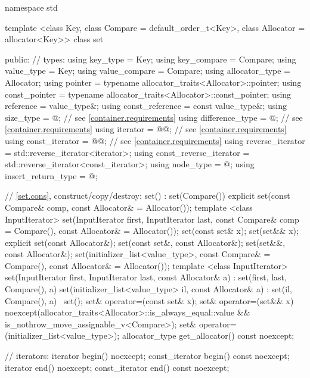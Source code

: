 \begin{codeblock}
namespace std {
  template <class Key, class Compare = default_order_t<Key>,
            class Allocator = allocator<Key>>
  class set {
  public:
    // types:
    using key_type               = Key;
    using key_compare            = Compare;
    using value_type             = Key;
    using value_compare          = Compare;
    using allocator_type         = Allocator;
    using pointer                = typename allocator_traits<Allocator>::pointer;
    using const_pointer          = typename allocator_traits<Allocator>::const_pointer;
    using reference              = value_type&;
    using const_reference        = const value_type&;
    using size_type              = @\impdef@; // see \ref{container.requirements}
    using difference_type        = @\impdef@; // see \ref{container.requirements}
    using iterator               = @@; // see \ref{container.requirements}
    using const_iterator         = @@; // see \ref{container.requirements}
    using reverse_iterator       = std::reverse_iterator<iterator>;
    using const_reverse_iterator = std::reverse_iterator<const_iterator>;
    using node_type              = @\unspec@;
    using insert_return_type     = @\unspec@;

    // \ref{set.cons}, construct/copy/destroy:
    set() : set(Compare()) { }
    explicit set(const Compare& comp, const Allocator& = Allocator());
    template <class InputIterator>
      set(InputIterator first, InputIterator last,
          const Compare& comp = Compare(), const Allocator& = Allocator());
    set(const set& x);
    set(set&& x);
    explicit set(const Allocator&);
    set(const set&, const Allocator&);
    set(set&&, const Allocator&);
    set(initializer_list<value_type>, const Compare& = Compare(),
        const Allocator& = Allocator());
    template <class InputIterator>
      set(InputIterator first, InputIterator last, const Allocator& a)
        : set(first, last, Compare(), a) { }
    set(initializer_list<value_type> il, const Allocator& a)
      : set(il, Compare(), a) { }
    ~set();
    set& operator=(const set& x);
    set& operator=(set&& x)
      noexcept(allocator_traits<Allocator>::is_always_equal::value &&
               is_nothrow_move_assignable_v<Compare>);
    set& operator=(initializer_list<value_type>);
    allocator_type get_allocator() const noexcept;

    // iterators:
    iterator               begin() noexcept;
    const_iterator         begin() const noexcept;
    iterator               end() noexcept;
    const_iterator         end() const noexcept;

}}
\end{codeblock}
